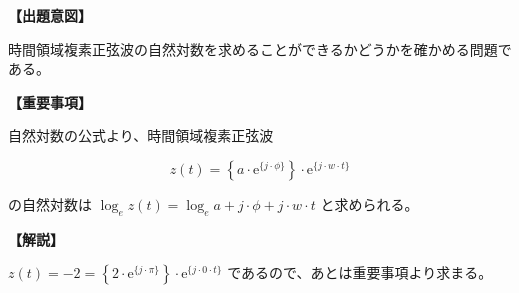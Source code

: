 \noindent \textbf{【出題意図】}

\bigskip
\noindent 時間領域複素正弦波の自然対数を求めることができるかどうかを確かめる問題である。

\vspace{1em}
\noindent \textbf{【重要事項】}

\medskip
\noindent 自然対数の公式より、時間領域複素正弦波 

\[
z(t) = \left \{ a \cdot \textrm{e}^{\{j \cdot \phi\}} \right \} \cdot \textrm{e}^{\{j \cdot w \cdot t \}}
\]

\bigskip
\noindent の自然対数は $\log_e z(t) =  \log_e a + j \cdot \phi + j \cdot w \cdot t$ と求められる。

\bigskip

\vspace{1em}
\noindent \textbf{【解説】}

\bigskip
\noindent $z(t) = -2 = \left \{ 2 \cdot \textrm{e}^{\{j \cdot \pi \}} \right \} \cdot \textrm{e}^{\{j \cdot 0 \cdot t \}}$ であるので、あとは重要事項より求まる。

